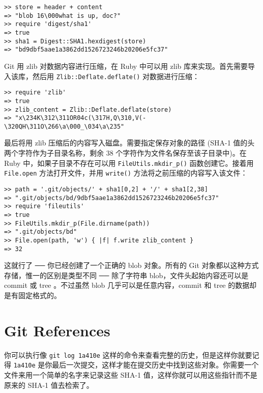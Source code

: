 \documentclass[a4paper]{book}
\begin{document}
\begin{shaded}\begin{verbatim}
>> store = header + content
=> "blob 16\000what is up, doc?"
>> require 'digest/sha1'
=> true
>> sha1 = Digest::SHA1.hexdigest(store)
=> "bd9dbf5aae1a3862dd1526723246b20206e5fc37"
\end{verbatim}\end{shaded}

Git 用 zlib 对数据内容进行压缩，在 Ruby 中可以用 zlib 库来实现。首先需要导入该库，然后用 \texttt{Zlib::Deflate.deflate()} 对数据进行压缩：

\begin{shaded}\begin{verbatim}
>> require 'zlib'
=> true
>> zlib_content = Zlib::Deflate.deflate(store)
=> "x\234K\312\311OR04c(\317H,Q\310,V(-\320QH\311O\266\a\000_\034\a\235"
\end{verbatim}\end{shaded}

最后将用 zlib 压缩后的内容写入磁盘。需要指定保存对象的路径 (SHA-1 值的头两个字符作为子目录名称，剩余 38 个字符作为文件名保存至该子目录中)。在 Ruby 中，如果子目录不存在可以用 \texttt{FileUtils.mkdir\_p()} 函数创建它。接着用 \texttt{File.open} 方法打开文件，并用 \texttt{write()} 方法将之前压缩的内容写入该文件：

\begin{shaded}\begin{verbatim}
>> path = '.git/objects/' + sha1[0,2] + '/' + sha1[2,38]
=> ".git/objects/bd/9dbf5aae1a3862dd1526723246b20206e5fc37"
>> require 'fileutils'
=> true
>> FileUtils.mkdir_p(File.dirname(path))
=> ".git/objects/bd"
>> File.open(path, 'w') { |f| f.write zlib_content }
=> 32
\end{verbatim}\end{shaded}

这就行了 ── 你已经创建了一个正确的 blob 对象。所有的 Git 对象都以这种方式存储，惟一的区别是类型不同 ── 除了字符串 blob，文件头起始内容还可以是 commit 或 tree 。不过虽然 blob 几乎可以是任意内容，commit 和 tree 的数据却是有固定格式的。

\section{Git References}

你可以执行像 \texttt{git log 1a410e} 这样的命令来查看完整的历史，但是这样你就要记得 \texttt{1a410e} 是你最后一次提交，这样才能在提交历史中找到这些对象。你需要一个文件来用一个简单的名字来记录这些 SHA-1 值，这样你就可以用这些指针而不是原来的 SHA-1 值去检索了。
\end{document}
